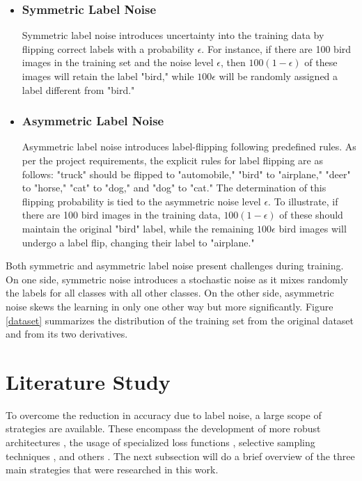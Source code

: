 \documentclass[11pt,twocolumn,letterpaper]{article}
\begin{document}
\begin{itemize}
    \item \subsubsection*{Symmetric Label Noise}
    Symmetric label noise introduces uncertainty into the training data by flipping correct labels with a probability $\epsilon$. For instance, if there are 100 bird images in the training set and the noise level $\epsilon$, then $100(1 - \epsilon)$ of these images will retain the label "bird," while $100\epsilon$ will be randomly assigned a label different from "bird."
    \item \subsubsection*{Asymmetric Label Noise}
    Asymmetric label noise introduces label-flipping following predefined rules. As per the project requirements, the explicit rules for label flipping are as follows: "truck" should be flipped to "automobile," "bird" to "airplane," "deer" to "horse," "cat" to "dog," and "dog" to "cat." The determination of this flipping probability is tied to the asymmetric noise level $\epsilon$. To illustrate, if there are 100 bird images in the training data, $100(1 - \epsilon)$ of these should maintain the original "bird" label, while the remaining $100\epsilon$ bird images will undergo a label flip, changing their label to "airplane." 
\end{itemize}

Both symmetric and asymmetric label noise present challenges during training. On one side, symmetric noise introduces a stochastic noise as it mixes randomly the labels for all classes with all other classes. On the other side, asymmetric noise skews the learning in only one other way but more significantly. Figure \ref{dataset} summarizes the distribution of the training set from the original dataset and from its two derivatives.

\section{Literature Study}
To overcome the reduction in accuracy due to label noise, a large scope of strategies are available. These encompass the development of more robust architectures \cite{bahriDeepKNNNoisy2020} \cite{xiaAdaptiveGeneralModel2022}, the usage of specialized loss functions \cite{englessonGeneralizedJensenShannonDivergence2021} \cite{maNormalizedLossFunctions2020} \cite{xuL_DMIInformationtheoreticNoiserobust2019}, selective sampling techniques \cite{songLearningNoisyLabels2022} \cite{chenSamplePriorGuided2022}, and others \cite{songLearningNoisyLabels2022}. The next subsection will do a brief overview of the three main strategies that were researched in this work.
\end{document}

